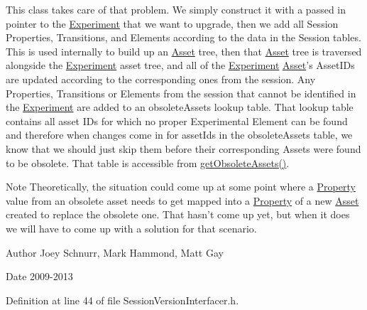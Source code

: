 This class takes care of that problem. We simply construct it with a passed in pointer to the \hyperlink{class_picto_1_1_experiment}{Experiment} that we want to upgrade, then we add all Session Properties, Transitions, and Elements according to the data in the Session tables. This is used internally to build up an \hyperlink{class_picto_1_1_asset}{Asset} tree, then that \hyperlink{class_picto_1_1_asset}{Asset} tree is traversed alongside the \hyperlink{class_picto_1_1_experiment}{Experiment} asset tree, and all of the \hyperlink{class_picto_1_1_experiment}{Experiment} \hyperlink{class_picto_1_1_asset}{Asset}'s Asset\-I\-Ds are updated according to the corresponding ones from the session. Any Properties, Transitions or Elements from the session that cannot be identified in the \hyperlink{class_picto_1_1_experiment}{Experiment} are added to an obsolete\-Assets lookup table. That lookup table contains all asset I\-Ds for which no proper Experimental Element can be found and therefore when changes come in for asset\-Ids in the obsolete\-Assets table, we know that we should just skip them before their corresponding Assets were found to be obsolete. That table is accessible from \hyperlink{class_picto_1_1_session_version_interfacer_a226ca2af73c8ebbd2c475a38b791b50a}{get\-Obsolete\-Assets()}.

\begin{DoxyNote}{Note}
Theoretically, the situation could come up at some point where a \hyperlink{class_picto_1_1_property}{Property} value from an obsolete asset needs to get mapped into a \hyperlink{class_picto_1_1_property}{Property} of a new \hyperlink{class_picto_1_1_asset}{Asset} created to replace the obsolete one. That hasn't come up yet, but when it does we will have to come up with a solution for that scenario. 
\end{DoxyNote}
\begin{DoxyAuthor}{Author}
Joey Schnurr, Mark Hammond, Matt Gay 
\end{DoxyAuthor}
\begin{DoxyDate}{Date}
2009-\/2013 
\end{DoxyDate}


Definition at line 44 of file Session\-Version\-Interfacer.\-h.



